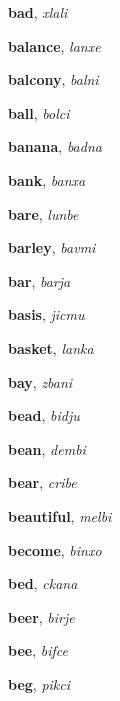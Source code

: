 \documentclass[12pt]{book}
\begin{document}
\begin{description}

\item[ ] \textbf{bad}, \textit{xlali}

\item[ ] \textbf{balance}, \textit{lanxe}

\item[ ] \textbf{balcony}, \textit{balni}

\item[ ] \textbf{ball}, \textit{bolci}

\item[ ] \textbf{banana}, \textit{badna}

\item[ ] \textbf{bank}, \textit{banxa}

\item[ ] \textbf{bare}, \textit{lunbe}

\item[ ] \textbf{barley}, \textit{bavmi}

\item[ ] \textbf{bar}, \textit{barja}

\item[ ] \textbf{basis}, \textit{jicmu}

\item[ ] \textbf{basket}, \textit{lanka}

\item[ ] \textbf{bay}, \textit{zbani}

\item[ ] \textbf{bead}, \textit{bidju}

\item[ ] \textbf{bean}, \textit{dembi}

\item[ ] \textbf{bear}, \textit{cribe}

\item[ ] \textbf{beautiful}, \textit{melbi}

\item[ ] \textbf{become}, \textit{binxo}

\item[ ] \textbf{bed}, \textit{ckana}

\item[ ] \textbf{beer}, \textit{birje}

\item[ ] \textbf{bee}, \textit{bifce}

\item[ ] \textbf{beg}, \textit{pikci}


\end{description}
\end{document}

